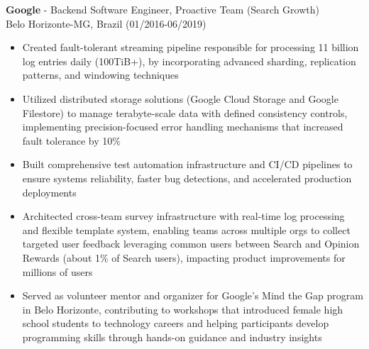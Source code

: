 
\normalsize{\textbf{Google} - Backend Software Engineer, Proactive Team (Search Growth)}\\
    \footnotesize{Belo Horizonte-MG, Brazil (01/2016-06/2019)}
    
\begin{itemize}
    \item \small{Created fault-tolerant streaming pipeline responsible for processing 11 billion log entries daily
        (100TiB+), by incorporating advanced sharding, replication patterns, and windowing techniques}

    \item \small{Utilized distributed storage solutions (Google Cloud Storage and Google Filestore) to manage
        terabyte-scale data with defined consistency controls, implementing precision-focused error handling mechanisms
        that increased fault tolerance by 10\%}

    \item \small{Built comprehensive test automation infrastructure and CI/CD pipelines to ensure systems reliability, faster bug detections, and accelerated production deployments}

    \item \small{Architected cross-team survey infrastructure with real-time log processing and flexible template
        system, enabling teams across multiple orgs to collect targeted user feedback leveraging
        common users between Search and Opinion Rewards (about 1\% of Search users), impacting product improvements for
        millions of users}

    \item \small{Served as volunteer mentor and organizer for Google's Mind the Gap program 
        in Belo Horizonte, contributing to workshops that introduced female high school students to 
        technology careers and helping participants develop programming skills through hands-on 
        guidance and industry insights}
\end{itemize}